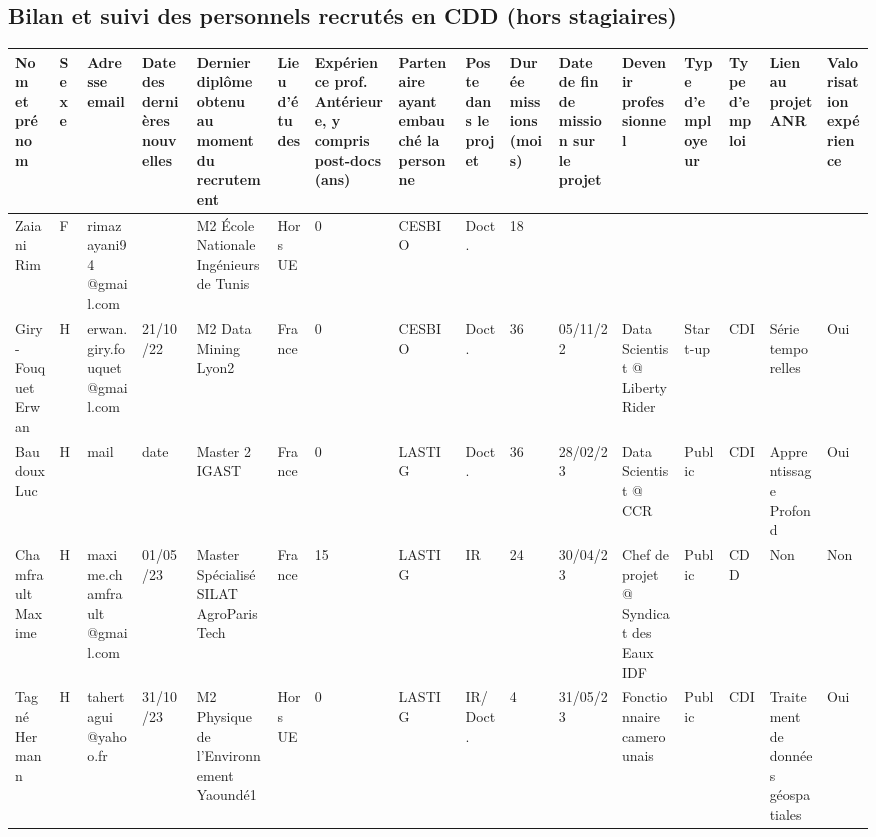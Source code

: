 \newpage
\begin{landscape}
\subsection{Bilan et suivi des personnels recrutés en CDD (hors stagiaires)}

\begin{table}[htbp]
\tiny
    \centering
    \begin{tabular}{|m{1.5cm}|m{0.3cm}|m{1.5cm}|m{1.15cm}|m{1.25cm}|m{1.2cm}|m{0.95cm}|m{}|m{0.9cm}|m{0.9cm}|m{1.1cm}|m{}|m{}|m{0.85cm}|m{1.1cm}|m{}|}
    \hline
Nom et prénom & Sexe& Adresse email & Date des dernières nouvelles
 & Dernier diplôme obtenu au moment du recrutement  & 
Lieu d'études& 
Expérience prof. Antérieure, y compris post-docs (ans)  & 
Partenaire ayant embauché la personne  & 
Poste dans le projet  & 
Durée  missions (mois)  & 
Date de fin de mission sur le projet & 
Devenir professionnel & 
Type d’employeur & 
Type d’emploi  & 
Lien au projet ANR & 
Valorisation expérience \\\hline

Zaiani Rim&F&rimazayani94 @gmail.com&\jordi{??}&M2 École Nationale Ingénieurs de Tunis&Hors UE&0&CESBIO&Doct.&18&&&&&&\\\hline
Giry-Fouquet Erwan&H& erwan.giry.fouquet @gmail.com&21/10/22&M2 Data Mining Lyon2&France&0&CESBIO&Doct.&36& 05/11/22&  Data Scientist @ Liberty Rider &Start-up&CDI&Série temporelles&Oui\\\hline
Baudoux Luc&H&mail&date&Master 2 IGAST&France&0&LASTIG&Doct.&36&28/02/23&Data Scientist @ CCR&Public&CDI&Apprentissage Profond&Oui\\\hline
Chamfrault Maxime&H&maxime.chamfrault @gmail.com&01/05/23&Master Spécialisé SILAT AgroParisTech&France&15&LASTIG&IR&24&30/04/23&Chef de projet @ Syndicat des Eaux IDF&Public&CDD&Non&Non\\\hline
Tagné Hermann&H&tahertagui @yahoo.fr&31/10/23&M2 Physique de l'Environnement Yaoundé1&Hors UE&0&LASTIG&IR/Doct.&4&31/05/23&Fonctionnaire camerounais&Public&CDI&Traitement de données géospatiales&Oui\\

      \hline
    \end{tabular}
    \label{tab:people}
\end{table}
 \end{landscape}

